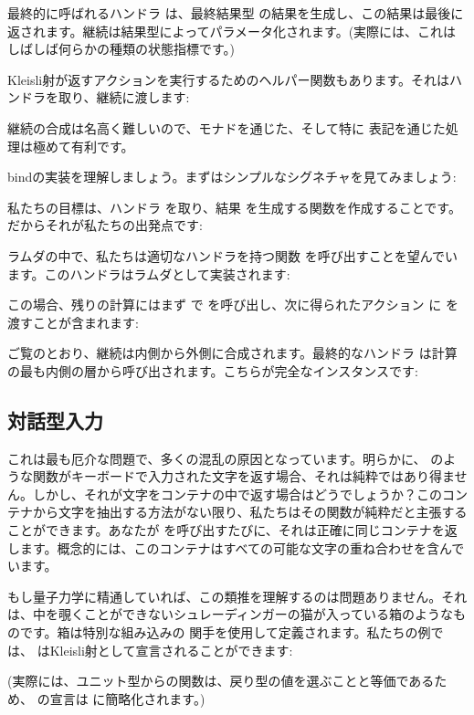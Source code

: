 最終的に呼ばれるハンドラ  は、最終結果型  の結果を生成し、この結果は最後に返されます。継続は結果型によってパラメータ化されます。(実際には、これはしばしば何らかの種類の状態指標です。) 

Kleisli射が返すアクションを実行するためのヘルパー関数もあります。それはハンドラを取り、継続に渡します: 

継続の合成は名高く難しいので、モナドを通じた、そして特に  表記を通じた処理は極めて有利です。

bindの実装を理解しましょう。まずはシンプルなシグネチャを見てみましょう: 

私たちの目標は、ハンドラ  を取り、結果  を生成する関数を作成することです。だからそれが私たちの出発点です: 

ラムダの中で、私たちは適切なハンドラを持つ関数  を呼び出すことを望んでいます。このハンドラはラムダとして実装されます: 

この場合、残りの計算にはまず  で  を呼び出し、次に得られたアクション  に  を渡すことが含まれます: 

ご覧のとおり、継続は内側から外側に合成されます。最終的なハンドラ  は計算の最も内側の層から呼び出されます。こちらが完全なインスタンスです: 


\subsection{対話型入力}

これは最も厄介な問題で、多くの混乱の原因となっています。明らかに、 のような関数がキーボードで入力された文字を返す場合、それは純粋ではあり得ません。しかし、それが文字をコンテナの中で返す場合はどうでしょうか？このコンテナから文字を抽出する方法がない限り、私たちはその関数が純粋だと主張することができます。あなたが  を呼び出すたびに、それは正確に同じコンテナを返します。概念的には、このコンテナはすべての可能な文字の重ね合わせを含んでいます。

もし量子力学に精通していれば、この類推を理解するのは問題ありません。それは、中を覗くことができないシュレーディンガーの猫が入っている箱のようなものです。箱は特別な組み込みの  関手を使用して定義されます。私たちの例では、 はKleisli射として宣言されることができます: 

 (実際には、ユニット型からの関数は、戻り型の値を選ぶことと等価であるため、 の宣言は  に簡略化されます。) 


